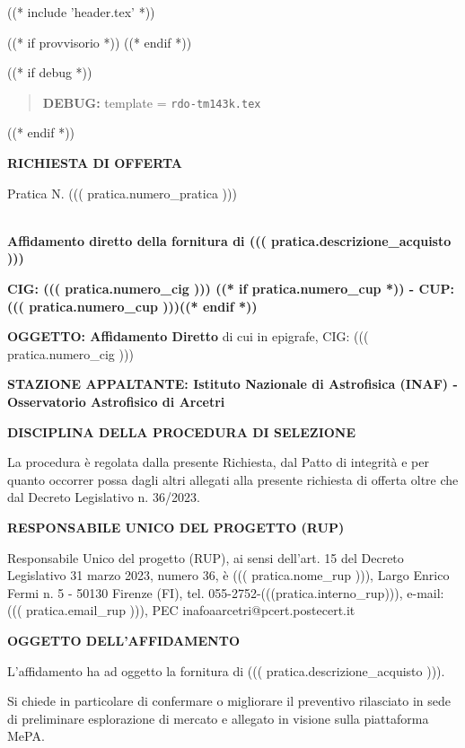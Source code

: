 
((* include 'header.tex' *))

((* if provvisorio *))
((* endif *))



\topaddr

((* if debug *))
\begin{quotation}
	\textbf{DEBUG:} template = \texttt{rdo-tm143k.tex}
\end{quotation}
((* endif *))

\begin{center}
\textbf{RICHIESTA DI OFFERTA}
\end{center}

Pratica N. ((( pratica.numero_pratica )))


~\\
\textbf{Affidamento diretto della fornitura di ((( pratica.descrizione_acquisto )))}

\textbf{CIG: ((( pratica.numero_cig )))
((* if pratica.numero_cup *)) - CUP: ((( pratica.numero_cup )))((* endif *))}

\textbf{OGGETTO: Affidamento Diretto} di cui in epigrafe, CIG: ((( pratica.numero_cig )))

\textbf{STAZIONE APPALTANTE: Istituto Nazionale di Astrofisica (INAF) - Osservatorio Astrofisico di Arcetri}

\textbf{DISCIPLINA DELLA PROCEDURA DI SELEZIONE}

La procedura è regolata dalla presente Richiesta, dal Patto di integrità
e per quanto occorrer possa dagli altri allegati alla presente richiesta
di offerta oltre che dal Decreto Legislativo n. 36/2023.


\textbf{RESPONSABILE UNICO DEL PROGETTO (RUP)}

Responsabile Unico del progetto (RUP), ai sensi dell'art. 15 del
Decreto Legislativo 31 marzo 2023, numero 36, è
 ((( pratica.nome_rup ))), Largo Enrico Fermi n. 5 - 50130 Firenze
 (FI), tel. 055-2752-(((pratica.interno_rup))),
e-mail: ((( pratica.email_rup ))), PEC inafoaarcetri@pcert.postecert.it


\textbf{OGGETTO DELL'AFFIDAMENTO}

L'affidamento ha ad oggetto la fornitura di  ((( pratica.descrizione_acquisto ))).

Si chiede in particolare di confermare o migliorare il preventivo
rilasciato in sede di preliminare esplorazione di mercato e allegato in
visione sulla piattaforma MePA.

